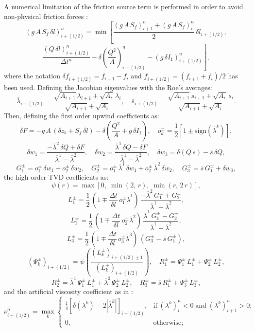 \documentclass[review,authoryear]{elsarticle}
\newcommand{\eq}[2]{\begin{equation}\label{#2}#1\end{equation}}
\newcommand{\sign} {\mathrm{sign}}
\newcommand{\PA}[1] {\left(#1\right)}
\newcommand{\C}[1] {\left[#1\right]}
\newcommand{\ABS}[1] {\left|#1\right|}
\newcommand{\IR}{_{i+(1/2)}}
\begin{document}
A numerical limitation of the friction source term is performed in order to
avoid non-physical friction forces \citep{JaviFriccion2}:
\[
	\PA{g\,A\,S_f\,\delta l}\IR^n=\min\left[
	\frac{\PA{g\,A\,S_f}_{i+1}^n+\PA{g\,A\,S_f}_i^n}{2}\,\delta l\IR,\right.
\]
\eq
{
	\left.\frac{(Q\,\delta l)\IR^n}{\Delta t^n}-\delta\PA{\frac{Q^2}{A}}\IR^n
	-\PA{g\,\delta I_1}\IR^n\right],
}{EqFrictionLimit}
where the notation $\delta f\IR=f_{i+1}-f_i$ and $f\IR=(f_{i+1}+f_i)/2$ has been
used. Defining the Jacobian eigenvalues with the Roe's \citep{Roe81,JaviSurcos1}
averages:
\eq
{
	\overline{\lambda}\IR=
	\frac{\sqrt{A_{i+1}}\,\lambda_{i+1}+\sqrt{A_i}\,\lambda_i}
	{\sqrt{A_{i+1}}+\sqrt{A_i}},\quad
	\overline{s}\IR=\frac{\sqrt{A_{i+1}}\,s_{i+1}+\sqrt{A_i}\,s_i}
	{\sqrt{A_{i+1}}+\sqrt{A_i}}.
}{EqRoeAv}
Then, defining the first order upwind coefficients as:
\[
	\delta F=-g\,A\,\PA{\delta z_b+S_f\,\delta l}
	-\delta\PA{\frac{Q^2}{A}+g\,\delta I_1},\quad
	o_k^\pm=\frac12\C{1\pm\sign\PA{\overline{\lambda}^k}},
\]
\[
	\delta w_1=\frac{-\overline{\lambda}^2\,\delta Q+\delta F}
	{\overline{\lambda}^1-\overline{\lambda}^2},\quad
	\delta w_2=\frac{\overline{\lambda}^1\,\delta Q-\delta F}
	{\overline{\lambda}^1-\overline{\lambda}^2},\quad
	\delta w_3=\delta\PA{Q\,s}-\overline{s}\,\delta Q,
\]
\eq
{
	G_1^\pm=o_1^\pm\,\delta w_1+o_2^\pm\,\delta w_2,\quad
	G_2^\pm=o_1^\pm\,\overline{\lambda}^1\,\delta w_1
	+o_2^\pm\,\overline{\lambda}^2\,\delta w_2,\quad
	G_3^\pm=\overline{s}\,G_1^\pm+\delta w_3,
}{EqCoeffUpw}
the high order TVD coefficients as:
\[\psi(r)=\max[0,\;\min(2,\,r),\;\min(r,\,2\,r)],\]
\[
	L_1^\pm=\frac12\,
	\PA{1\mp\frac{\Delta t}{\delta l}\,o_1^\pm\overline{\lambda}^1}\,
	\frac{-\overline{\lambda}^2\,G_1^\pm+G_2^\pm}
	{\overline{\lambda}^1-\overline{\lambda}^2},
\]
\[
	L_2^\pm=\frac12\,
	\PA{1\mp\frac{\Delta t}{\delta l}\,o_2^\pm\overline{\lambda}^2}\,
	\frac{\overline{\lambda}^1\,G_1^\pm-G_2^\pm}
	{\overline{\lambda}^1-\overline{\lambda}^2},
\]
\[
	L_3^\pm=\frac12\,
	\PA{1\mp\frac{\Delta t}{\delta l}\,o_3^\pm\overline{\lambda}^3}\,
	\PA{G_3^\pm-\overline{s}\,G_1^\pm},
\]
\[
	\PA{\Psi_k^\pm}\IR
	=\psi\PA{\frac{\PA{L_k^\pm}_{i+(1/2)\pm 1}}{\PA{L_k^\pm}\IR}},\quad
	R_1^\pm=\Psi_1^\pm\,L_1^\pm+\Psi_2^\pm\,L_2^\pm,
\]
\eq
{
	R_2^\pm=\overline{\lambda}^1\,\Psi_1^\pm\,L_1^\pm
	+\overline{\lambda}^2\,\Psi_2^\pm\,L_2^\pm,\quad
	R_3^\pm=\overline{s}\,R_1^\pm+\Psi_3^\pm\,L_3^\pm,
}{EqCoeffTVD}
and the artificial viscosity coefficient as in \cite{JaviImp}:
\eq
{
	\nu\IR^n=\max_k\left\{\begin{array}{cl}
	\frac{1}{4}\C{\delta(\lambda^k)-2\ABS{\overline{\lambda}^k}}\IR,&
	\mathrm{if}\;(\lambda^k)_i^n<0\;\mathrm{and}\;(\lambda^k)_{i+1}^n>0;\\
	0,&\mathrm{otherwise};\end{array}\right.
}{EqEntnu}
\end{document}
